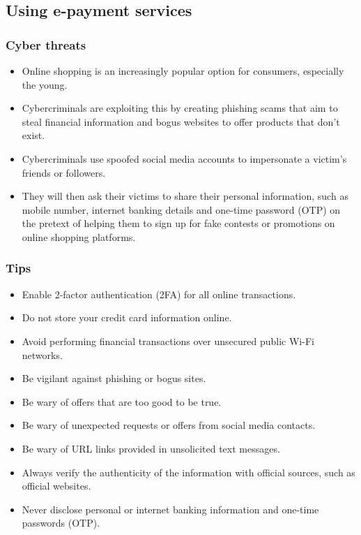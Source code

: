 \documentclass[11pt]{article}
\begin{document}
\clearpage
\subsection{Using e-payment services}
\label{sec:orgc6c701f}

\subsubsection{Cyber threats}
\label{sec:orge85c4ae}
\begin{itemize}
\item Online shopping is an increasingly popular option for consumers, especially the young.
\item Cybercriminals are exploiting this by creating phishing scams that aim to steal financial information and bogus websites to offer products that don't exist.
\item Cybercriminals use spoofed social media accounts to impersonate a victim's friends or followers.
\item They will then ask their victims to share their personal information, such as mobile number, internet banking details and one-time password (OTP) on the pretext of helping them to sign up for fake contests or promotions on online shopping platforms.
\end{itemize}
\subsubsection{Tips}
\label{sec:orgbb806e3}
\begin{itemize}
\item Enable 2-factor authentication (2FA) for all online transactions.
\item Do not store your credit card information online.
\item Avoid performing financial transactions over unsecured public Wi-Fi networks.
\item Be vigilant against phishing or bogus sites.
\item Be wary of offers that are too good to be true.
\item Be wary of unexpected requests or offers from social media contacts.
\item Be wary of URL links provided in unsolicited text messages.
\item Always verify the authenticity of the information with official sources, such as official websites.
\item Never disclose personal or internet banking information and one-time passwords (OTP).
\end{itemize}
\end{document}
